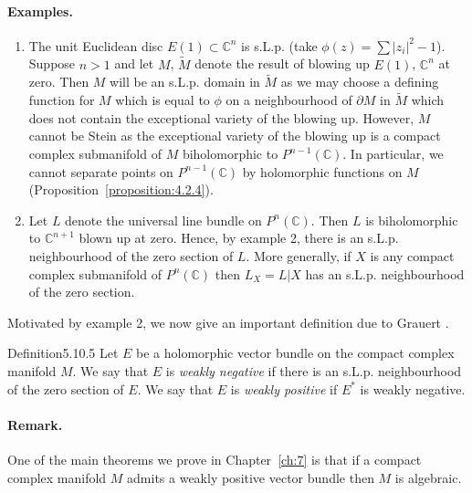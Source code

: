 \paragraph{Examples.}
\begin{enumerate}[start=2]
\item The unit Euclidean disc $E(1)\subset\mathbb C^n$ is s.L.p. (take $\phi(z)=\sum|z_i|^2-1$). Suppose $n>1$ and let $M$, $\widetilde M$ denote the result of blowing up $E(1)$, $\mathbb C^n$ at zero. Then $M$ will be an s.L.p. domain in $\widetilde M$ as we may choose a defining function for $M$ which is equal to $\phi$ on a neighbourhood of $\partial M$ in $\widetilde M$ which does not contain the exceptional variety of the blowing up. However, $M$ cannot be Stein as the exceptional variety of the blowing up is a compact complex submanifold of $M$ biholomorphic to $P^{n-1}(\mathbb C)$. In particular, we cannot separate points on $P^{n-1}(\mathbb C)$ by holomorphic functions on $M$ (Proposition~\ref{proposition:4.2.4}).
\item Let $L$ denote the universal line bundle on $P^n(\mathbb C)$. Then $L$ is biholomorphic to $\mathbb C^{n+1}$ blown up at zero. Hence, by example 2, there is an s.L.p. neighbourhood of the zero section of $L$. More generally, if $X$ is any compact complex submanifold of $P^n(\mathbb C)$ then $L_X=L|X$ has an s.L.p. neighbourhood of the zero section.
\end{enumerate}
Motivated by example 2, we now give an important definition due to Grauert \cite{bib:II:grauert-h:1}.
\begin{originaltheorem}{Definition}{5.10.5}
Let $E$ be a holomorphic vector bundle on the compact complex manifold $M$. We say that $E$ is \emph{weakly negative} if there
is an s.L.p. neighbourhood of the zero section of $E$. We say that $E$ is \emph{weakly positive} if $E^*$ is weakly negative.
\end{originaltheorem}
\paragraph{Remark.} One of the main theorems we prove in Chapter~\ref{ch:7} is that if a compact complex manifold $M$ admits a weakly positive vector bundle then $M$ is algebraic.

